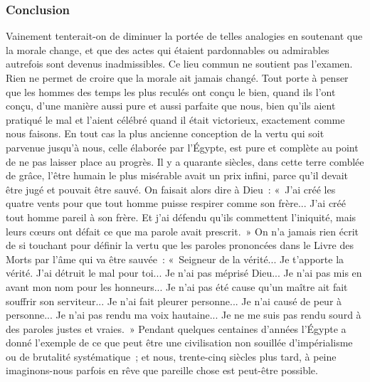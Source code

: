 \documentclass[french,twoside]{book} %
\begin{document}
\subsubsection[Conclusion]{Conclusion}
\noindent \par
Vainement tenterait-on de diminuer la portée de telles analogies en soutenant que la morale change, et que des actes qui étaient pardonnables ou admirables autrefois sont devenus inadmissibles. Ce lieu commun ne soutient pas l'examen. Rien ne permet de croire que la morale ait jamais changé. Tout porte à penser que les hommes des temps les plus reculés ont conçu le bien, quand ils l'ont conçu, d'une manière aussi pure et aussi parfaite que nous, bien qu'ils aient pratiqué le mal et l'aient célébré quand il était victorieux, exacte­ment comme nous faisons. En tout cas la plus ancienne conception de la vertu qui soit parvenue jusqu'à nous, celle élaborée par l'Égypte, est pure et complète au point de ne pas laisser place au progrès. Il y a quarante siècles, dans cette terre comblée de grâce, l'être humain le plus misérable avait un prix infini, parce qu'il devait être jugé et pouvait être sauvé. On faisait alors dire à Dieu : « J'ai créé les quatre vents pour que tout homme puisse respirer comme son frère... J'ai créé tout homme pareil à son frère. Et j'ai défendu qu'ils commettent l'iniquité, mais leurs cœurs ont défait ce que ma parole avait prescrit. » On n'a jamais rien écrit de si touchant pour définir la vertu que les paroles prononcées dans le Livre des Morts par l'âme qui va être sauvée : « Seigneur de la vérité... Je t'apporte la vérité. J'ai détruit le mal pour toi... Je n'ai pas méprisé Dieu... Je n'ai pas mis en avant mon nom pour les honneurs... Je n'ai pas été cause qu'un maître ait fait souffrir son serviteur... Je n'ai fait pleurer personne... Je n'ai causé de peur à personne... Je n'ai pas rendu ma voix hautaine... Je ne me suis pas rendu sourd à des paroles justes et vraies. » Pendant quelques centaines d'années l'Égypte a donné l'exemple de ce que peut être une civilisation non souillée d'impérialisme ou de brutalité systéma­tique ; et nous, trente-cinq siècles plus tard, à peine imaginons-nous parfois en rêve que pareille chose est peut-être possible.\par
\end{document}
